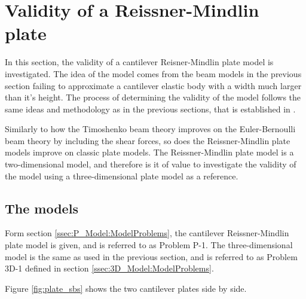\documentclass[../../main.tex]{subfiles}
\begin{document}
\section{Validity of a Reissner-Mindlin plate} \label{sec:validity-of-a-plate}

In this section, the validity of a cantilever Reisner-Mindlin plate model is investigated. The idea of the model comes from the beam models in the previous section failing to approximate a cantilever elastic body with a width much larger than it's height. The process of determining the validity of the model follows the same ideas and methodology as in the previous sections, that is established in \cite{LVV09}.

Similarly to how the Timoshenko beam theory improves on the Euler-Bernoulli beam theory by including the shear forces, so does the Reissner-Mindlin plate models improve on classic plate models. The Reissner-Mindlin plate model is a two-dimensional model, and therefore is it of value to investigate the validity of the model using a three-dimensional plate model as a reference.

\subsection{The models}
Form section \ref{ssec:P_Model:ModelProblems}, the cantilever Reissner-Mindlin plate model is given, and is referred to as Problem P-1. The three-dimensional model is the same as used in the previous section, and is referred to as Problem 3D-1 defined in section \ref{ssec:3D_Model:ModelProblems}.

Figure \ref{fig:plate_sbs} shows the two cantilever plates side by side.
\end{document}
